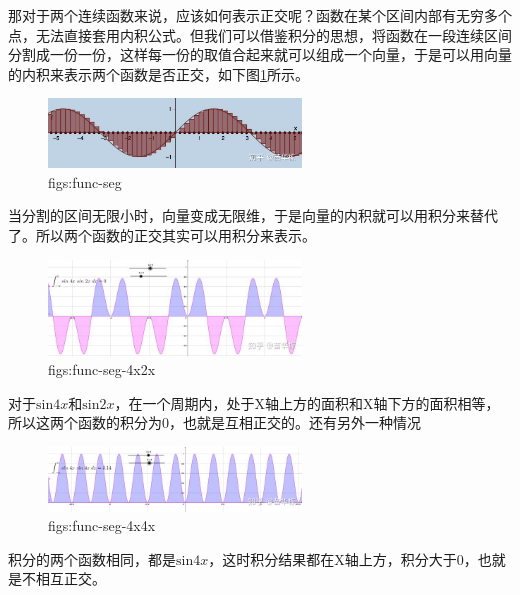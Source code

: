 \documentclass[lang=cn,11pt,a4paper,cite=numbers]{elegantpaper}
\begin{document}
  那对于两个连续函数来说，应该如何表示正交呢？函数在某个区间内部有无穷多个点，无法直接套用内积公式。但我们可以借鉴积分的思想，将函数在一段连续区间分割成一份一份，这样每一份的取值合起来就可以组成一个向量，于是可以用向量的内积来表示两个函数是否正交，如下图\ref{figs:func-seg}所示。
\begin{figure}[!htb]
  \centering
  \includegraphics[width=0.6\textwidth]{figs/func-seg.png}
  \caption{figs:func-seg}
  \label{figs:func-seg}
\end{figure}
当分割的区间无限小时，向量变成无限维，于是向量的内积就可以用积分来替代了。所以两个函数的正交其实可以用积分来表示。
\begin{figure}[!htb]
  \centering
  \includegraphics[width=0.6\textwidth]{figs/func-seg-4x2x.png}
  \caption{figs:func-seg-4x2x}
  \label{figs:func-seg-4x2x}
\end{figure}
对于$\mathrm{sin}4x$和$\mathrm{sin}2x$，在一个周期内，处于X轴上方的面积和X轴下方的面积相等，所以这两个函数的积分为0，也就是互相正交的。还有另外一种情况
\begin{figure}[!htb]
  \centering
  \includegraphics[width=0.6\textwidth]{figs/func-seg-4x4x.png}
  \caption{figs:func-seg-4x4x}
  \label{figs:func-seg-4x4x}
\end{figure}
积分的两个函数相同，都是$\mathrm{sin}4x$，这时积分结果都在X轴上方，积分大于0，也就是不相互正交。
\end{document}
